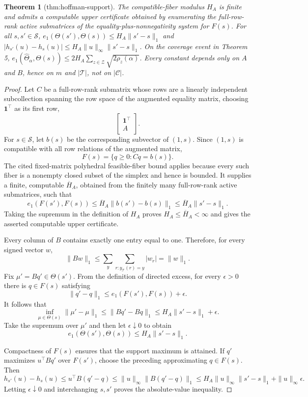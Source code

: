 \documentclass{article}
\newtheorem{theorem}{Theorem}
\begin{document}
\begin{theorem}[thm:hoffman-support]\label{thm:hoffman-support}
The compatible-fiber modulus \(H_A\) is finite and admits a computable upper certificate obtained by enumerating the full-row-rank active submatrices of the equality-plus-nonnegativity system for \(F(s)\). For all \(s,s'\in\mathcal S\), \(e_1(\Theta(s'),\Theta(s))\le H_A\|s'-s\|_1\) and \(|h_{s'}(u)-h_s(u)|\le H_A\|u\|_\infty\|s'-s\|_1\). On the coverage event in Theorem 5, \(e_1(\widehat\Theta_\alpha,\Theta(s))\le2H_A\sum_{z\in\mathcal Z}\sqrt{2\rho_z(\alpha)}\). Every constant depends only on \(A\) and \(B\), hence on \(m\) and \(|\mathcal T|\), not on \(|\mathcal C|\).
\end{theorem}
\begin{proof}
Let \(C\) be a full-row-rank submatrix whose rows are a linearly independent subcollection spanning the row space of the augmented equality matrix, choosing \(\mathbf 1^\top\) as its first row,
\[
\begin{bmatrix}\mathbf 1^\top\\ A\end{bmatrix}.
\]
For \(s\in\mathcal S\), let \(b(s)\) be the corresponding subvector of \((1,s)\).  Since \((1,s)\) is compatible with all row relations of the augmented matrix,
\[
F(s)=\{q\ge0:Cq=b(s)\}.
\]
The cited fixed-matrix polyhedral feasible-fiber bound applies because every such fiber is a nonempty closed subset of the simplex and hence is bounded.  It supplies a finite, computable \(\overline H_A\), obtained from the finitely many full-row-rank active submatrices, such that
\[
e_1(F(s'),F(s))
\le\overline H_A\|b(s')-b(s)\|_1
\le\overline H_A\|s'-s\|_1.
\]
Taking the supremum in the definition of \(H_A\) proves \(H_A\le\overline H_A<\infty\) and gives the asserted computable upper certificate.

Every column of \(B\) contains exactly one entry equal to one.  Therefore, for every signed vector \(w\),
\[
\|Bw\|_1
\le\sum_y\sum_{r:y_{\mathcal T}(r)=y}|w_r|
=\|w\|_1.
\]
Fix \(\mu'=Bq'\in\Theta(s')\).  From the definition of directed excess, for every \(\epsilon>0\) there is \(q\in F(s)\) satisfying
\[
\|q'-q\|_1
\le e_1(F(s'),F(s))+\epsilon.
\]
It follows that
\[
\inf_{\mu\in\Theta(s)}\|\mu'-\mu\|_1
\le\|Bq'-Bq\|_1
\le H_A\|s'-s\|_1+\epsilon.
\]
Take the supremum over \(\mu'\) and then let \(\epsilon\downarrow0\) to obtain
\[
e_1(\Theta(s'),\Theta(s))\le H_A\|s'-s\|_1.
\]

Compactness of \(F(s)\) ensures that the support maximum is attained.  If \(q'\) maximizes \(u^\top Bq'\) over \(F(s')\), choose the preceding approximating \(q\in F(s)\).  Then
\[
h_{s'}(u)-h_s(u)
\le u^\top B(q'-q)
\le\|u\|_\infty\|B(q'-q)\|_1
\le H_A\|u\|_\infty\|s'-s\|_1+\|u\|_\infty\epsilon.
\]
Letting \(\epsilon\downarrow0\) and interchanging \(s,s'\) proves the absolute-value inequality.


\end{proof}
\end{document}
